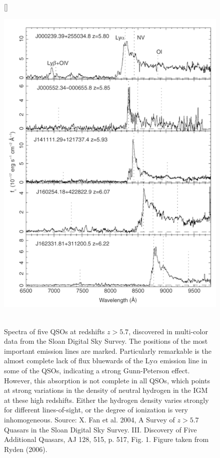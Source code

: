 \documentclass[a4paper,11pt]{article}
\begin{document}
\begin{figure}[t]
    [\FBwidth]
    {\caption{\footnotesize{\\Spectra of five QSOs at redshifts $z>5.7$, discovered in multi-color data from the Sloan Digital Sky Survey. The positions of the most important emission lines are marked. Particularly remarkable is the almost complete lack of flux bluewards of the Ly$\alpha$ emission line in some of the QSOs, indicating a strong Gunn-Peterson effect. However, this absorption is not complete in all QSOs, which points at strong variations in the density of neutral hydrogen in the IGM at these high redshifts. Either the hydrogen density varies strongly for different lines-of-sight, or the degree of ionization is very inhomogeneous. Source: X. Fan et al. 2004, A Survey of $z>5.7$ Quasars in the Sloan Digital Sky Survey. III. Discovery of Five Additional Quasars, AJ 128, 515, p. 517, Fig. 1. Figure taken from Ryden (2006).}}
    \label{fig:qsoabsorption}}
    {\includegraphics[width=12cm]{figures/QSOabsorption.png}}
\end{figure}
\end{document}

